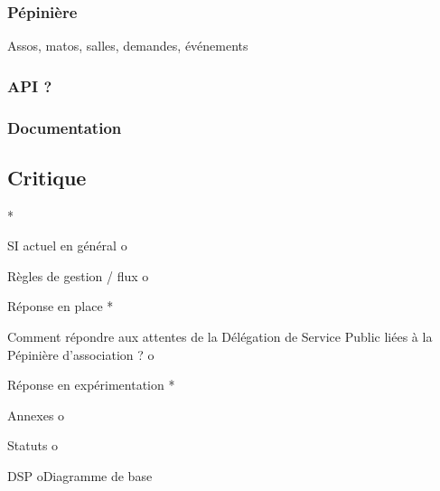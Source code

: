 \documentclass[a4wide,10pt,2pages]{report}
\begin{document}
\subsubsection{Pépinière}
Assos, matos, salles, demandes, événements
\subsubsection{API ?}
\subsubsection{Documentation}
\subsection{Critique}
    *

      SI actuel en général
          o

            Règles de gestion / flux
          o

            Réponse en place
    *

      Comment répondre aux attentes de la Délégation de Service Public liées à la Pépinière d'association ?
          o

            Réponse en expérimentation
    *

      Annexes
          o

            Statuts
          o

            DSP
          oDiagramme de base
\end{document}
